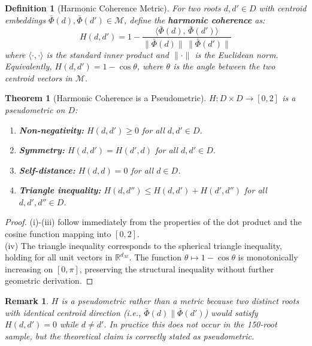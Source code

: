 \documentclass{article}
\newtheorem{theorem}{Theorem}
\newtheorem{definition}{Definition}
\newtheorem{remark}{Remark}
\begin{document}
\begin{definition}[Harmonic Coherence Metric]
\label{def:metric}
For two roots $d, d' \in D$ with centroid embeddings $\bar{\Phi}(d), \bar{\Phi}(d') \in \mathcal{M}$, define the \textbf{harmonic coherence} as:
\[
H(d,d') = 1 - \frac{\langle \bar{\Phi}(d),\, \bar{\Phi}(d') \rangle}{\|\bar{\Phi}(d)\|\,\|\bar{\Phi}(d')\|}
\]
where $\langle \cdot, \cdot \rangle$ is the standard inner product and $\|\cdot\|$ is the Euclidean norm. Equivalently, $H(d,d') = 1 - \cos\theta$, where $\theta$ is the angle between the two centroid vectors in $\mathcal{M}$.
\end{definition}

\begin{theorem}[Harmonic Coherence is a Pseudometric]
\label{thm:metric}
$H : D \times D \to [0,2]$ is a pseudometric on $D$:
\begin{enumerate}[label=(\roman*)]
  \item \textbf{Non-negativity:} $H(d,d') \geq 0$ for all $d,d' \in D$.
  \item \textbf{Symmetry:} $H(d,d') = H(d',d)$ for all $d,d' \in D$.
  \item \textbf{Self-distance:} $H(d,d) = 0$ for all $d \in D$.
  \item \textbf{Triangle inequality:} $H(d,d'') \leq H(d,d') + H(d',d'')$ for all $d,d',d'' \in D$.
\end{enumerate}
\end{theorem}

\begin{proof}
(i)-(iii) follow immediately from the properties of the dot product and the cosine function mapping into $[0,2]$.\\
(iv) The triangle inequality corresponds to the spherical triangle inequality, holding for all unit vectors in $\mathbb{R}^{d_\mathcal{M}}$. The function $\theta \mapsto 1-\cos\theta$ is monotonically increasing on $[0,\pi]$, preserving the structural inequality without further geometric derivation.
\end{proof}

\begin{remark}
$H$ is a pseudometric rather than a metric because two distinct roots with identical centroid direction (i.e., $\bar{\Phi}(d) \parallel \bar{\Phi}(d')$) would satisfy $H(d,d') = 0$ while $d \neq d'$. In practice this does not occur in the 150-root sample, but the theoretical claim is correctly stated as pseudometric.
\end{remark}
\end{document}
